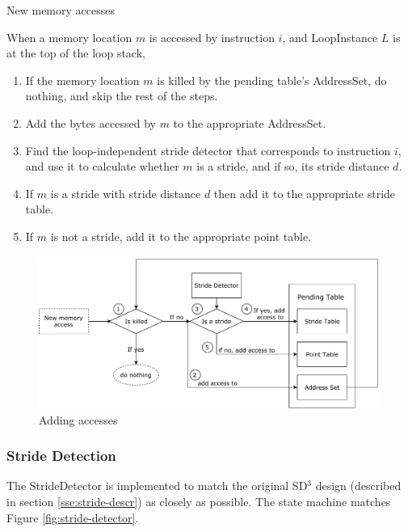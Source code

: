 \documentclass[12pt,twoside]{reedthesis}
\begin{document}
		\begin{algorithm}
			\caption{New memory accesses}\label{new-memory-acc}
			When a memory location $m$ is accessed by instruction $i$, and LoopInstance $L$ is at the top of the loop stack,
			\begin{enumerate}
				\item If the memory location $m$ is killed by the pending table's AddressSet, do nothing, and skip the rest of the steps. 
				\item Add the bytes accessed by $m$ to the appropriate AddressSet.
				\item Find the loop-independent stride detector that corresponds to instruction $i$, and use it to calculate whether $m$ is a stride, and if so, its stride distance $d$. 
				\item If $m$ is a stride with stride distance $d$ then add it to the appropriate stride table.
				\item If $m$ is not a stride, add it to the appropriate point table. 
			\end{enumerate} 
		\end{algorithm}
	
		
		\begin{figure}
			\caption{Adding accesses}
			\label{fig:add-access}
			\includegraphics[scale=0.6]{add_access.pdf}
		\end{figure}
		
		
		\subsubsection{Stride Detection}
		
		The StrideDetector is implemented to match the original SD$^3$ design  (described in section \ref{sse:stride-descr}) as closely as possible. The state machine matches Figure \ref{fig:stride-detector}.
		
\end{document}
